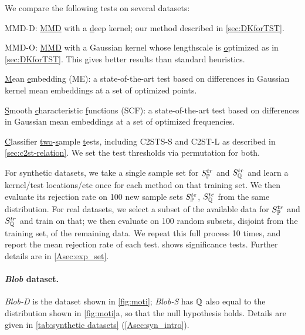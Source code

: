 \documentclass{article}
\begin{document}
We compare the following tests on several datasets:
\begin{compactitem}
    \item MMD-D: \underline{MMD} with a \underline{d}eep kernel; our method described in \cref{sec:DKforTST}.
    \item MMD-O: \underline{MMD} with a Gaussian kernel whose lengthscale is \underline{o}ptimized as in \cref{sec:DKforTST}. This gives better results than standard heuristics.
    \item \underline{M}ean \underline{e}mbedding (ME): a state-of-the-art test \citep{Chwialkowski2015,Jitkrittum2016}
    based on differences in Gaussian kernel mean embeddings
    at a set of optimized points.
    \item \underline{S}mooth \underline{c}haracteristic \underline{f}unctions (SCF): a state-of-the-art test \citep{Chwialkowski2015,Jitkrittum2016}
    based on differences in Gaussian mean embeddings at a set of optimized frequencies.
    \item \underline{C}lassifier \underline{two}-\underline{s}ample \underline{t}ests, including C2STS-S \citep{Lopez:C2ST} and C2ST-L \citep{cheng:net-logits} as described in \cref{sec:c2st-relation}.
    We set the test thresholds via permutation for both.
\end{compactitem}

For synthetic datasets,
we take a single sample set for $S^{tr}_\P$ and $S^{tr}_\Q$
and learn a kernel/test locations/etc once for each method on that training set.
We then evaluate its rejection rate
on 100 new sample sets $S^{te}_\P$, $S^{te}_\Q$
from the same distribution.
For real datasets,
we select a subset of the available data for $S^{tr}_\P$ and $S^{tr}_\Q$
and train on that;
we then evaluate on 100 random subsets, disjoint from the training set, of the remaining data.
We repeat this full process 10 times,
and report the mean rejection rate of each test.
 shows significance tests. Further details
are in \cref{Asec:exp_set}.

\vspace{-1.5ex}\paragraph{\emph{Blob} dataset.}
\emph{Blob-D} is the dataset shown in \cref{fig:moti};
\emph{Blob-S} has $\Q$ also equal to the distribution shown in \cref{fig:moti}a, so that the null hypothesis holds.
Details are given in \cref{tab:synthetic datasets} (\cref{Asec:syn_intro}).
\end{document}
